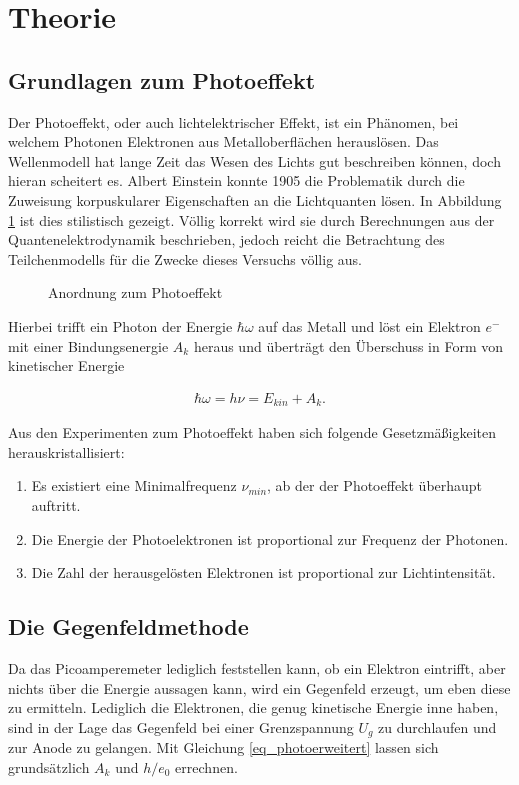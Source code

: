 
\section{Theorie}
\setcounter{page}{1}
\subsection{Grundlagen zum Photoeffekt}
Der Photoeffekt, oder auch lichtelektrischer Effekt, ist ein Phänomen, bei welchem Photonen Elektronen aus Metalloberflächen herauslösen.
Das Wellenmodell hat lange Zeit das Wesen des Lichts gut beschreiben können, doch hieran scheitert es. Albert Einstein konnte 1905 die
Problematik durch die Zuweisung korpuskularer Eigenschaften an die Lichtquanten lösen. In Abbildung \ref{pic_photo} ist dies stilistisch gezeigt. Völlig korrekt wird sie durch Berechnungen aus
der Quantenelektrodynamik beschrieben, jedoch reicht die Betrachtung des Teilchenmodells für die Zwecke dieses Versuchs völlig aus.

\begin{figure}[H]
 
 \caption{Anordnung zum Photoeffekt}
 \label{pic_photo}
\end{figure}

Hierbei trifft ein Photon der Energie $\hbar\omega$ auf das Metall und löst ein Elektron $e^-$ mit einer Bindungsenergie $A_k$ heraus
und überträgt den Überschuss in Form von kinetischer Energie

\begin{align}
 \hbar\omega = h\nu = E_{kin} + A_k.
 \label{eq_photo}
\end{align}

Aus den Experimenten zum Photoeffekt haben sich folgende Gesetzmäßigkeiten herauskristallisiert:

\begin{enumerate}
 \item Es existiert eine Minimalfrequenz $\nu_{min}$, ab der der Photoeffekt überhaupt auftritt.
 \item Die Energie der Photoelektronen ist proportional zur Frequenz der Photonen.
 \item Die Zahl der herausgelösten Elektronen ist proportional zur Lichtintensität.
\end{enumerate}

\subsection{Die Gegenfeldmethode}
Da das Picoamperemeter lediglich feststellen kann, ob ein Elektron eintrifft, aber nichts über die Energie aussagen kann, wird ein
Gegenfeld erzeugt, um eben diese zu ermitteln. Lediglich die Elektronen, die genug kinetische Energie inne haben, sind in der Lage
das Gegenfeld bei einer Grenzspannung $U_g$ zu durchlaufen und zur Anode zu gelangen. Mit Gleichung \eqref{eq_photoerweitert} lassen sich grundsätzlich $A_k$ und 
$h/e_0$ errechnen.

